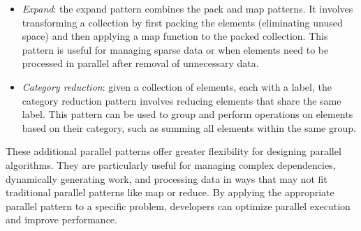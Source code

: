 \begin{itemize}
    \item \textit{Expand}: the expand pattern combines the pack and map patterns.
        It involves transforming a collection by first packing the elements (eliminating unused space) and then applying a map function to the packed collection. 
        This pattern is useful for managing sparse data or when elements need to be processed in parallel after removal of unnecessary data.
    \item \textit{Category reduction}: given a collection of elements, each with a label, the category reduction pattern involves reducing elements that share the same label. 
        This pattern can be used to group and perform operations on elements based on their category, such as summing all elements within the same group.
\end{itemize}
These additional parallel patterns offer greater flexibility for designing parallel algorithms. 
They are particularly useful for managing complex dependencies, dynamically generating work, and processing data in ways that may not fit traditional parallel patterns like map or reduce. 
By applying the appropriate parallel pattern to a specific problem, developers can optimize parallel execution and improve performance.